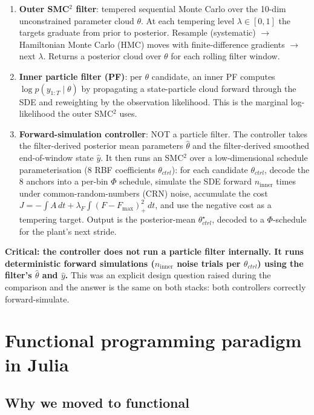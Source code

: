 \documentclass[11pt,a4paper]{article}
\begin{document}
\begin{enumerate}[itemsep=2pt]
  \item \textbf{Outer SMC$^2$ filter}: tempered sequential Monte Carlo
        over the 10-dim unconstrained parameter cloud $\theta$.
        At each tempering level $\lambda \in [0, 1]$ the targets
        graduate from prior to posterior. Resample
        (systematic) $\to$ Hamiltonian Monte Carlo (HMC) moves
        with finite-difference gradients $\to$ next $\lambda$.
        Returns a posterior cloud over $\theta$ for each rolling
        filter window.
  \item \textbf{Inner particle filter (PF)}: per $\theta$ candidate,
        an inner PF computes $\log p(y_{1:T} \mid \theta)$ by
        propagating a state-particle cloud forward through the SDE
        and reweighting by the observation likelihood. This is the
        marginal log-likelihood the outer SMC$^2$ uses.
  \item \textbf{Forward-simulation controller}: NOT a particle
        filter. The controller takes the filter-derived posterior
        mean parameters $\hat\theta$ and the filter-derived smoothed
        end-of-window state $\hat y$. It then runs an SMC$^2$ over
        a low-dimensional schedule parameterisation (8 RBF
        coefficients $\theta_{ctrl}$): for each candidate
        $\theta_{ctrl}$, decode the 8 anchors into a
        per-bin $\Phi$ schedule, simulate the SDE forward
        $n_{\text{inner}}$ times under common-random-numbers (CRN)
        noise, accumulate the cost
        $J = -\!\int A \, dt + \lambda_F \!\int (F - F_{\max})_+^2 \, dt$,
        and use the negative cost as a tempering target. Output is
        the posterior-mean $\theta_{ctrl}^\star$, decoded to a
        $\Phi$-schedule for the plant's next stride.
\end{enumerate}

\textbf{Critical: the controller does not run a particle filter
internally. It runs deterministic forward simulations
($n_{\text{inner}}$ noise trials per $\theta_{ctrl}$) using the
filter's $\hat\theta$ and $\hat y$.} This was an explicit design
question raised during the comparison and the answer is the same
on both stacks: both controllers correctly forward-simulate.

\section{Functional programming paradigm in Julia}

\subsection{Why we moved to functional}
\end{document}
